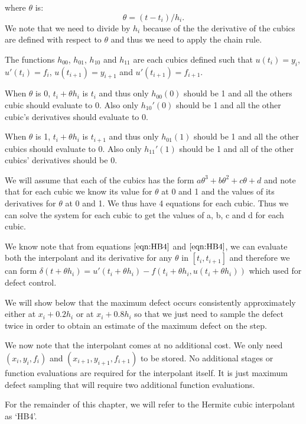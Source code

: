 \documentclass{article}
\begin{document}
where $\theta$ is:
\begin{equation}
\label{eqn:HB4_theta}
\theta = (t - t_i) / h_i.
\end{equation}
We note that we need to divide by $h_i$ because of the the derivative of the cubics are defined with respect to $\theta$ and thus we need to apply the chain rule.

The functions $h_{00}$, $h_{01}$, $h_{10}$ and $h_{11}$ are each cubics defined such that $u(t_i)= y_i$, $u'(t_i) = f_i$, $u(t_{i+1}) = y_{i + 1}$ and $u'(t_{i + 1}) = f_{i + 1}$.

When $\theta$ is 0, $t_i + \theta h_i$ is $t_i$ and thus only $h_{00}(0)$ should be 1 and all the others cubic should evaluate to 0. Also only $h_{10}'(0)$ should be 1 and all the other cubic's derivatives should evaluate to 0.

When $\theta$ is 1, $t_i + \theta h_i$ is $t_{i + 1}$ and thus only $h_{01}(1)$ should be 1 and all the other cubics should evaluate to 0. Also only $h_{11}'(1)$ should be 1 and all of the other cubics' derivatives should be 0.

We will assume that each of the cubics has the form $a\theta^3 + b\theta^2 + c\theta + d$ and note that for each cubic we know its value for $\theta$ at 0 and 1 and the values of its derivatives for $\theta$ at 0 and 1. We thus have 4 equations for each cubic. Thus we can solve the system for each cubic to get the values of a, b, c and d for each cubic.

We know note that from equations $\ref{eqn:HB4}$ and $\ref{eqn:HB4}$, we can evaluate both the interpolant and its derivative for any $\theta$ in $[t_i, t_{i + 1}]$ and therefore we can form $\delta(t + \theta h_i) = u'(t_i + \theta h_i) - f(t_i + \theta h_i, u(t_i + \theta h_i))$ which used for defect control.

We will show below that the maximum defect occurs consistently approximately either at $x_i + 0.2h_i$ or at $x_i + 0.8h_i$ so that we just need to sample the defect twice in order to obtain an estimate of the maximum defect on the step.

We now note that the interpolant comes at no additional cost. We only need $(x_i, y_i, f_i)$ and $(x_{i + 1}, y_{i + 1}, f_{i + 1})$ to be stored. No additional stages or function evaluations are required for the interpolant itself. It is just maximum defect sampling that will require two additional function evaluations.

For the remainder of this chapter, we will refer to the Hermite cubic interpolant as `HB4'.
\end{document}
